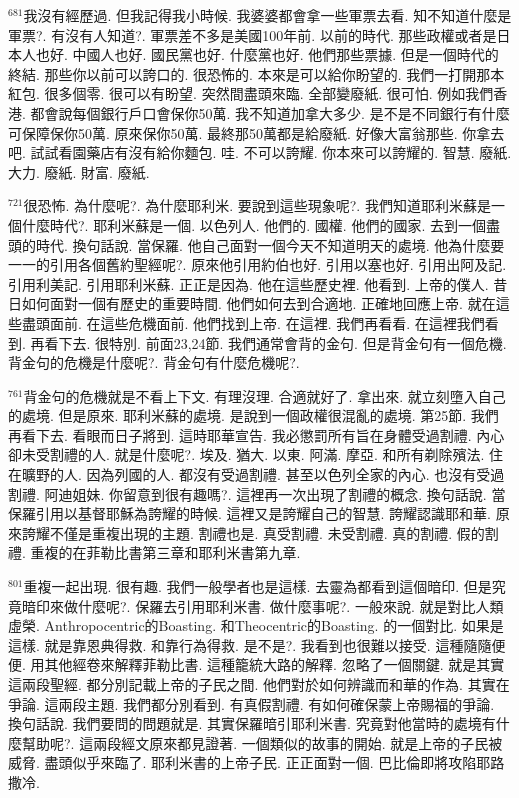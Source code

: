 \documentclass{book}
\begin{document}
$^{681}$我沒有經歷過.
但我記得我小時候.
我婆婆都會拿一些軍票去看.
知不知道什麼是軍票?.
有沒有人知道?.
軍票差不多是美國100年前.
以前的時代.
那些政權或者是日本人也好.
中國人也好.
國民黨也好.
什麼黨也好.
他們那些票據.
但是一個時代的終結.
那些你以前可以誇口的.
很恐怖的.
本來是可以給你盼望的.
我們一打開那本紅包.
很多個零.
很可以有盼望.
突然間盡頭來臨.
全部變廢紙.
很可怕.
例如我們香港.
都會說每個銀行戶口會保你50萬.
我不知道加拿大多少.
是不是不同銀行有什麼可保障保你50萬.
原來保你50萬.
最終那50萬都是給廢紙.
好像大富翁那些.
你拿去吧.
試試看園藥店有沒有給你麵包.
哇.
不可以誇耀.
你本來可以誇耀的.
智慧.
廢紙.
大力.
廢紙.
財富.
廢紙.

$^{721}$很恐怖.
為什麼呢?.
為什麼耶利米.
要說到這些現象呢?.
我們知道耶利米蘇是一個什麼時代?.
耶利米蘇是一個.
以色列人.
他們的.
國權.
他們的國家.
去到一個盡頭的時代.
換句話說.
當保羅.
他自己面對一個今天不知道明天的處境.
他為什麼要一一的引用各個舊約聖經呢?.
原來他引用約伯也好.
引用以塞也好.
引用出阿及記.
引用利美記.
引用耶利米蘇.
正正是因為.
他在這些歷史裡.
他看到.
上帝的僕人.
昔日如何面對一個有歷史的重要時間.
他們如何去到合適地.
正確地回應上帝.
就在這些盡頭面前.
在這些危機面前.
他們找到上帝.
在這裡.
我們再看看.
在這裡我們看到.
再看下去.
很特別.
前面23,24節.
我們通常會背的金句.
但是背金句有一個危機.
背金句的危機是什麼呢?.
背金句有什麼危機呢?.

$^{761}$背金句的危機就是不看上下文.
有理沒理.
合適就好了.
拿出來.
就立刻墮入自己的處境.
但是原來.
耶利米蘇的處境.
是說到一個政權很混亂的處境.
第25節.
我們再看下去.
看眼而日子將到.
這時耶華宣告.
我必懲罰所有旨在身體受過割禮.
內心卻未受割禮的人.
就是什麼呢?.
埃及.
猶大.
以東.
阿滿.
摩亞.
和所有剃除殯法.
住在曠野的人.
因為列國的人.
都沒有受過割禮.
甚至以色列全家的內心.
也沒有受過割禮.
阿迪姐妹.
你留意到很有趣嗎?.
這裡再一次出現了割禮的概念.
換句話說.
當保羅引用以基督耶穌為誇耀的時候.
這裡又是誇耀自己的智慧.
誇耀認識耶和華.
原來誇耀不僅是重複出現的主題.
割禮也是.
真受割禮.
未受割禮.
真的割禮.
假的割禮.
重複的在菲勒比書第三章和耶利米書第九章.

$^{801}$重複一起出現.
很有趣.
我們一般學者也是這樣.
去靈為都看到這個暗印.
但是究竟暗印來做什麼呢?.
保羅去引用耶利米書.
做什麼事呢?.
一般來說.
就是對比人類虛榮.
Anthropocentric的Boasting.
和Theocentric的Boasting.
的一個對比.
如果是這樣.
就是靠恩典得救.
和靠行為得救.
是不是?.
我看到也很難以接受.
這種隨隨便便.
用其他經卷來解釋菲勒比書.
這種籠統大路的解釋.
忽略了一個關鍵.
就是其實這兩段聖經.
都分別記載上帝的子民之間.
他們對於如何辨識而和華的作為.
其實在爭論.
這兩段主題.
我們都分別看到.
有真假割禮.
有如何確保蒙上帝賜福的爭論.
換句話說.
我們要問的問題就是.
其實保羅暗引耶利米書.
究竟對他當時的處境有什麼幫助呢?.
這兩段經文原來都見證著.
一個類似的故事的開始.
就是上帝的子民被威脅.
盡頭似乎來臨了.
耶利米書的上帝子民.
正正面對一個.
巴比倫即將攻陷耶路撒冷.
\end{document}
